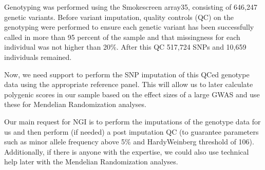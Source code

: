 \documentclass[letterpaper,10pt,english]{sphinxmanual}
\begin{document}
Genotyping was performed using the Smokescreen array35, consisting of 646,247 genetic variants. Before variant imputation, quality controls (QC) on the genotyping were performed to ensure each genetic variant has been successfully called in more than 95 percent of the sample and that missingness for each individual was not higher than 20\%. After this QC 517,724 SNPs and 10,659 individuals remained.

Now, we need support to perform the SNP imputation of this QCed genotype data using the appropriate reference panel. This will allow us to later calculate polygenic scores in our sample based on the effect sizes of a large GWAS and use these for Mendelian Randomization analyses.

Our main request for NGI is to perform the imputations of the genotype data for us and then perform (if needed) a post imputation QC (to guarantee parameters such as minor allele frequency above 5\% and Hardy\sphinxhyphen{}Weinberg threshold of 10\sphinxhyphen{}6). Additionally, if there is anyone with the expertise, we could also use technical help later with the Mendelian Randomization analyses.
\end{document}
